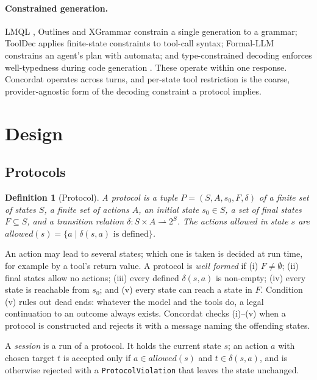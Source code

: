 \documentclass[11pt]{article}
\newtheorem{definition}{Definition}
\begin{document}
\paragraph{Constrained generation.}
LMQL \citep{beurerkellner2023lmql}, Outlines \citep{willard2023outlines} and XGrammar
\citep{dong2024xgrammar} constrain a single generation to a grammar; ToolDec
\citep{zhang2023tooldec} applies finite-state constraints to tool-call syntax;
Formal-LLM \citep{li2024formalllm} constrains an agent's plan with automata; and
type-constrained decoding enforces well-typedness during code generation
\citep{mundler2025typeconstrained}. These operate within one response. Concordat
operates across turns, and per-state tool restriction is the coarse, provider-agnostic
form of the decoding constraint a protocol implies.

\section{Design}
\label{sec:design}

\subsection{Protocols}

\begin{definition}[Protocol]
A protocol is a tuple $P = (S, A, s_0, F, \delta)$ of a finite set of states $S$, a
finite set of actions $A$, an initial state $s_0 \in S$, a set of final states
$F \subseteq S$, and a transition relation $\delta : S \times A \rightharpoonup
2^{S}$. The actions \emph{allowed} in state $s$ are
$\mathit{allowed}(s) = \{ a \mid \delta(s,a) \text{ is defined} \}$.
\end{definition}

An action may lead to several states; which one is taken is decided at run time, for
example by a tool's return value. A protocol is \emph{well formed} if
(i) $F \neq \emptyset$;
(ii) final states allow no actions;
(iii) every defined $\delta(s,a)$ is non-empty;
(iv) every state is reachable from $s_0$; and
(v) every state can reach a state in $F$.
Condition (v) rules out dead ends: whatever the model and the tools do, a legal
continuation to an outcome always exists. Concordat checks (i)--(v) when a protocol is
constructed and rejects it with a message naming the offending states.

A \emph{session} is a run of a protocol. It holds the current state $s$; an action $a$
with chosen target $t$ is accepted only if $a \in \mathit{allowed}(s)$ and
$t \in \delta(s,a)$, and is otherwise rejected with a \texttt{ProtocolViolation} that
leaves the state unchanged.
\end{document}
